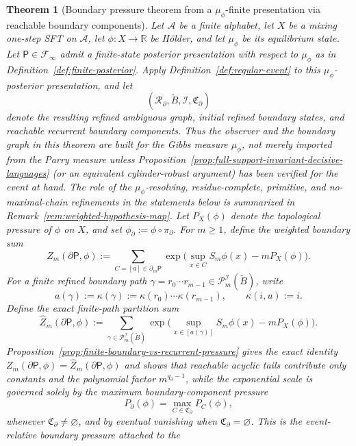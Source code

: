 \documentclass{etds}%
\numberwithin{equation}{section}
\theoremstyle{plain}
\newtheorem{theorem}{Theorem}[section]
\theoremstyle{definition}
\theoremstyle{remark}
\begin{document}
\begin{theorem}[Boundary pressure theorem from a $\mu_\phi$-finite presentation via reachable boundary components]
\label{thm:weighted-boundary-pressure}
Let $\mathcal{A}$ be a finite alphabet, let $X$ be a mixing one-step SFT on
$\mathcal{A}$, let
$\phi:X\to\mathbb{R}$ be H\"older, and let $\mu_\phi$ be its equilibrium
state.  Let $\mathsf{P}\in\mathcal{F}_\infty$ admit a finite-state posterior
presentation with respect to $\mu_\phi$ as in
Definition~\ref{def:finite-posterior}.  Apply
Definition~\ref{def:regular-event} to this $\mu_\phi$-posterior presentation,
and let
\[
(\mathcal{R}_\partial,\widetilde{B},\mathcal{I},\mathfrak{C}_\partial)
\]
denote the resulting refined ambiguous graph, initial refined boundary states,
and reachable recurrent boundary components.  Thus the observer and the
boundary graph in this theorem are built for the Gibbs measure $\mu_\phi$, not
merely imported from the Parry measure unless
Proposition~\ref{prop:full-support-invariant-decisive-languages} (or an
equivalent cylinder-robust argument) has been verified for the event at hand.
The role of the $\mu_\phi$-resolving, residue-complete, primitive, and
no-maximal-chain refinements in the statements below is summarized in
Remark~\ref{rem:weighted-hypothesis-map}.  Let
$P_X(\phi)$ denote the topological pressure of $\phi$ on $X$, and set
$\phi_\partial:=\phi\circ\pi_\partial$.  For $m\ge 1$, define
the weighted boundary sum
\[
Z_m(\partial\mathsf{P},\phi)
:=\sum_{C=[a]\in\partial_m\mathsf{P}}
\exp\!\bigl(\sup_{x\in C}S_m\phi(x)-mP_X(\phi)\bigr).
\]
For a finite refined boundary path
$\gamma=r_0\cdots r_{m-1}\in\mathcal{P}_m^{\mathcal{I}}(\widetilde{B})$, write
\[
a(\gamma):=\kappa(\gamma):=\kappa(r_0)\cdots\kappa(r_{m-1}),
\qquad
\kappa(i,u):=i.
\]
Define the exact finite-path partition sum
\[
\widehat Z_m(\partial\mathsf{P},\phi)
:=\sum_{\gamma\in\mathcal{P}_m^{\mathcal{I}}(\widetilde{B})}
\exp\!\bigl(\sup_{x\in[a(\gamma)]}S_m\phi(x)-mP_X(\phi)\bigr).
\]
Proposition~\ref{prop:finite-boundary-vs-recurrent-pressure} gives the exact identity
$Z_m(\partial\mathsf{P},\phi)=\widehat Z_m(\partial\mathsf{P},\phi)$ and shows
that reachable acyclic tails contribute only constants and the polynomial
factor $m^{q_\partial-1}$, while the exponential scale is governed solely by
the maximum boundary-component pressure
\[
P_\partial(\phi)=\max_{C\in\mathfrak{C}_\partial}P_C(\phi),
\]
whenever $\mathfrak{C}_\partial\neq\varnothing$, and by eventual vanishing
when $\mathfrak{C}_\partial=\varnothing$.  This is the event-relative boundary pressure attached to the

\end{theorem}
\end{document}
